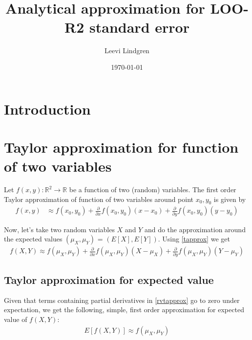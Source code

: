 \documentclass{article}
\title{Analytical approximation for LOO-R2 standard error}
\author{Leevi Lindgren}
\date{\today}
\begin{document}
\maketitle

\section{Introduction}

\section{Taylor approximation for function of two variables}

Let $f(x, y): \mathbb{R}^2 \rightarrow \mathbb{R}$ be a function of two (random) variables. The first order Taylor approximation of function of two variables around point $x_0, y_0$ is given by
\begin{align}
    f(x, y) &\approx f(x_0, y_0) + \frac{\partial }{\partial x} f(x_0, y_0) (x - x_0) + \frac{\partial }{\partial y} f(x_0, y_0) (y - y_0) \label{tapprox}
\end{align}

Now, let's take two random variables $X$ and $Y$ and do the approximation around the expected values $(\mu_X, \mu_Y)$ = $(E[X], E[Y])$. Using \eqref{tapprox} we get
\begin{align}
    f(X, Y) \approx f(\mu_X, \mu_Y) + \frac{\partial }{\partial x} f(\mu_X, \mu_Y) (X - \mu_X) + \frac{\partial }{\partial y} f(\mu_X, \mu_Y) (Y - \mu_Y) \label{rvtapprox}
\end{align}

\subsection{Taylor approximation for expected value}
Given that terms containing partial derivatives in \eqref{rvtapprox} go to zero under expectation, we get the following, simple, first order approximation for expected value of $f(X, Y)$:
\begin{align}
    E[f(X, Y)] \approx f(\mu_X, \mu_Y) \label{eapprox}
\end{align}
\end{document}
